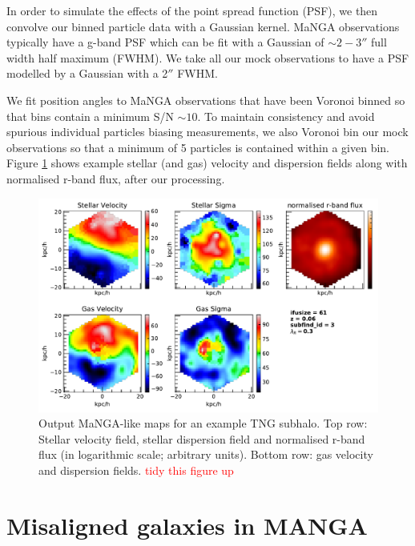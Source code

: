 \documentclass[fleqn,usenatbib]{mnras}
\newcommand{\red}[1]{{\textcolor{red}{#1}}}
\begin{document}
In order to simulate the effects of the point spread function (PSF), we then convolve our binned particle data with a Gaussian kernel. MaNGA observations typically have a g-band PSF which can be fit with a Gaussian of $\sim 2-3''$ full width half maximum (FWHM). We take all our mock observations to have a PSF modelled by a Gaussian with a 2$''$ FWHM. 

We fit position angles to MaNGA observations that have been Voronoi binned so that bins contain a minimum S/N $\sim 10$. To maintain consistency and avoid spurious individual particles biasing measurements, we also Voronoi bin our mock observations so that a minimum of 5 particles is contained within a given bin. Figure \ref{fig:example_obs} shows example stellar (and gas) velocity and dispersion fields along with normalised r-band flux, after our processing. 

\begin{figure}
	\includegraphics[width=\linewidth]{example_grid.pdf}
    \caption{Output MaNGA-like maps for an example TNG subhalo. Top row: Stellar velocity field, stellar dispersion field and normalised r-band flux (in logarithmic scale; arbitrary units). Bottom row: gas velocity and dispersion fields. \red{tidy this figure up}}
    \label{fig:example_obs}
\end{figure}

\section{Misaligned galaxies in MANGA} \label{sec:manga_results}
\end{document}
